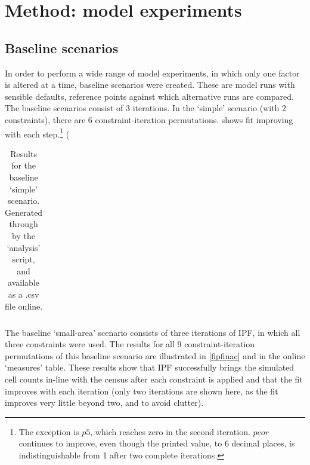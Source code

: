 \documentclass[a4paper,10pt]{article}
\begin{document}


\section{Method: model experiments}
\subsection{Baseline scenarios}
In order to perform a wide range of model experiments, 
in which only one factor is altered at a time, 
baseline scenarios were created. These are model runs with sensible 
defaults, reference points against which alternative runs are compared.
The baseline scenarios consist of 3 iterations. In the ‘simple’ scenario (with 2 constraints), 
there are 6 constraint-iteration permutations.
 shows 
fit improving with each step.\footnote{The exception is $p5$,
which reaches zero in the second iteration. $pcor$ continues to improve, 
even though the printed value, to 6 decimal places, is
indistinguishable from 1 after two complete iterations.} (

\begin{table}[htbp]
\caption{Results for the baseline `simple' scenario. Generated through by the ‘analysis’ script, and available as a .csv file online.}
\begin{center}
\begin{tabular}{rrrrr}
\toprule
\bottomrule
\end{tabular}
\end{center}
\label{tblresults1}
\end{table}

The baseline `small-area' scenario consists of three
 iterations of IPF, in which all three constraints were 
used. The results for all 9 constraint-iteration permutations 
of this baseline scenario are illustrated in \cref{fipfinac} and %
in the online `measures' table. These results show that IPF successfully 
brings the simulated cell counts in-line with the census after each constraint 
is applied and that the fit improves with each iteration (only two iterations are 
shown here, as the fit improves very little beyond two, and to avoid clutter).
\end{document}
